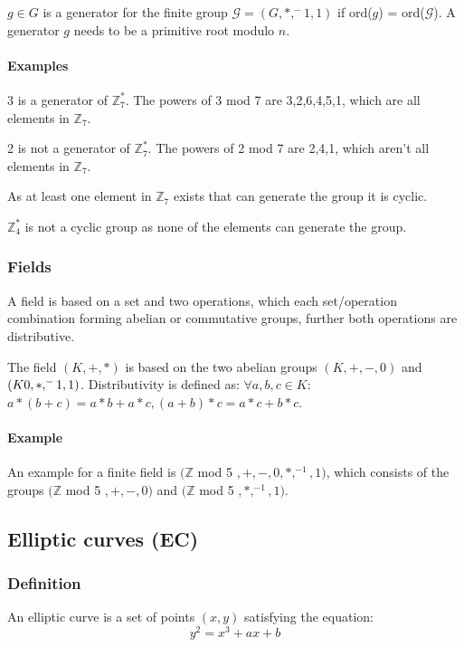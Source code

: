 \documentclass[a4paper,12pt]{scrartcl}
\begin{document}
$g\in G$ is a generator for the finite group $\mathcal{G} = (G, *, ^-1, 1)$ if ord($g$) = ord($\mathcal{G}$). A generator $g$ needs to be a primitive root modulo $n$.

\paragraph{Examples}

3 is a generator of $\mathbb{Z}_7^*$. The powers of 3 mod 7 are 3,2,6,4,5,1, which are all elements in $\mathbb{Z}_7$.

2 is not a generator of $\mathbb{Z}_7^*$. The powers of 2 mod 7 are 2,4,1, which aren't all elements in $\mathbb{Z}_7$.

As at least one element in $\mathbb{Z}_7$ exists that can generate the group it is cyclic.

$\mathbb{Z}_4^*$ is not a cyclic group as none of the elements can generate the group.

\subsubsection{Fields}

A field is based on a set and two operations, which each set/operation combination forming abelian or commutative groups, further both operations are distributive.

The field $(K, +, *)$ is based on the two abelian groups $(K, +, -, 0)$ and $(K\\0, *, ^-1, 1)$. Distributivity is defined as: $\forall a,b,c\in K$: $a*(b+c) = a*b+a*c, (a+b)*c = a*c+b*c$.

\paragraph{Example}

An example for a finite field is $(\mathbb{Z}$ mod 5 $, +, -, 0, *, ^{-1}, 1)$, which consists of the groups $(\mathbb{Z}$ mod 5 $, +, -, 0)$ and $(\mathbb{Z}$ mod 5 $, *, ^{-1}, 1)$.


\subsection{Elliptic curves (EC)}
\subsubsection{Definition}
An elliptic curve is a set of points \((x,y)\) satisfying the equation:
\begin{equation*}
y^2 = x^3 + ax + b
\end{equation*}
\end{document}
